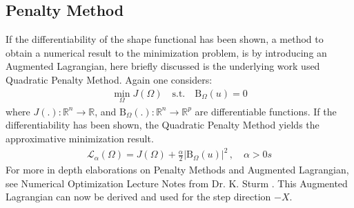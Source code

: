 \subsection*{Penalty Method}
If the differentiability of the shape functional has been shown, a method to obtain a numerical result to the minimization problem,
is by introducing an Augmented Lagrangian, here briefly discussed is the underlying work used Quadratic Penalty Method. Again one considers:
\begin{align*}
    \min_{ \Omega} J( \Omega) \quad \text{s.t.} \quad \mathrm{B}_{\Omega}(u) = 0
\end{align*}
where $J(.) : \mathbb{R}^n \rightarrow \mathbb{R}$, and $\mathrm{B}_{\Omega}(.):\mathbb{R}^n \rightarrow \mathbb{R}^p$ are differentiable functions.
If the differentiability has been shown, the Quadratic Penalty Method yields the approximative minimization result.
\begin{align*}
    \mathcal{L}_{\alpha}(\Omega) = J(\Omega) + \frac{\alpha}{2}|\mathrm{B}_{\Omega}(u)|^2 \, , \quad \alpha > 0s
\end{align*}
For more in depth elaborations on Penalty Methods and Augmented Lagrangian, 
see Numerical Optimization Lecture Notes from Dr. K. Sturm \cite{lecture_notes_sturm}. This Augmented Lagrangian can now be derived 
and used for the step direction $-X$.